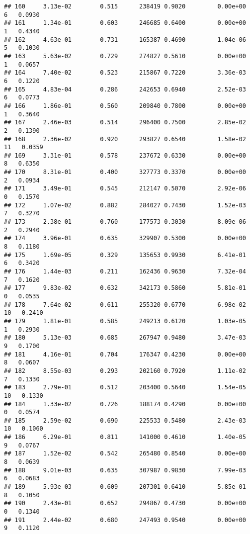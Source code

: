 \documentclass[
]{article}
\begin{document}
\begin{verbatim}
## 160     3.13e-02        0.515      238419 0.9020         0.00e+00   6   0.0930
## 161     1.34e-01        0.603      246685 0.6400         0.00e+00   1   0.4340
## 162     4.63e-01        0.731      165387 0.4690         1.04e-06   5   0.1030
## 163     5.63e-02        0.729      274827 0.5610         0.00e+00   1   0.0657
## 164     7.40e-02        0.523      215867 0.7220         3.36e-03   6   0.1220
## 165     4.83e-04        0.286      242653 0.6940         2.52e-03   6   0.0773
## 166     1.86e-01        0.560      209840 0.7800         0.00e+00   1   0.3640
## 167     2.46e-03        0.514      296400 0.7500         2.85e-02   2   0.1390
## 168     2.36e-02        0.920      293827 0.6540         1.58e-02  11   0.0359
## 169     3.31e-01        0.578      237672 0.6330         0.00e+00   8   0.6350
## 170     8.31e-01        0.400      327773 0.3370         0.00e+00   2   0.0934
## 171     3.49e-01        0.545      212147 0.5070         2.92e-06   0   0.1570
## 172     1.07e-02        0.882      284027 0.7430         1.52e-03   7   0.3270
## 173     2.38e-01        0.760      177573 0.3030         8.09e-06   2   0.2940
## 174     3.96e-01        0.635      329907 0.5300         0.00e+00   8   0.1180
## 175     1.69e-05        0.329      135653 0.9930         6.41e-01   6   0.3420
## 176     1.44e-03        0.211      162436 0.9630         7.32e-04   7   0.1620
## 177     9.83e-02        0.632      342173 0.5860         5.81e-01   0   0.0535
## 178     7.64e-02        0.611      255320 0.6770         6.98e-02  10   0.2410
## 179     1.81e-01        0.585      249213 0.6120         1.03e-05   1   0.2930
## 180     5.13e-03        0.685      267947 0.9480         3.47e-03   9   0.1700
## 181     4.16e-01        0.704      176347 0.4230         0.00e+00   8   0.0607
## 182     8.55e-03        0.293      202160 0.7920         1.11e-02   7   0.1330
## 183     2.79e-01        0.512      203400 0.5640         1.54e-05  10   0.1330
## 184     1.33e-02        0.726      188174 0.4290         0.00e+00   0   0.0574
## 185     2.59e-02        0.690      225533 0.5480         2.43e-03  10   0.1060
## 186     6.29e-01        0.811      141000 0.4610         1.40e-05   9   0.0767
## 187     1.52e-02        0.542      265480 0.8540         0.00e+00   8   0.0639
## 188     9.01e-03        0.635      307987 0.9830         7.99e-03   6   0.0683
## 189     5.93e-03        0.609      207301 0.6410         5.85e-01   8   0.1050
## 190     2.43e-01        0.652      294867 0.4730         0.00e+00   0   0.1340
## 191     2.44e-02        0.680      247493 0.9540         0.00e+00   9   0.1120

\end{verbatim}
\end{document}
